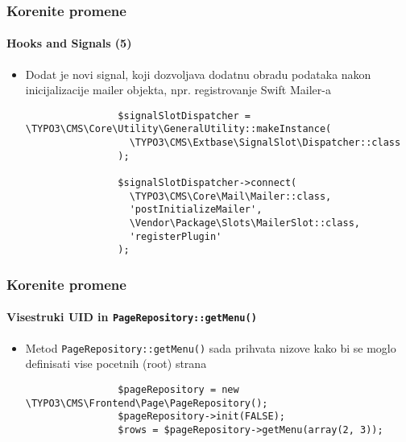 
\begin{frame}[fragile]
	\frametitle{Korenite promene}
	\framesubtitle{Hooks and Signals (5)}

	\lstset{basicstyle=\tiny\ttfamily}

	\begin{itemize}

		\item Dodat je novi signal, koji dozvoljava dodatnu obradu podataka nakon inicijalizacije
			mailer objekta, npr. registrovanje Swift Mailer-a

			\begin{lstlisting}
				$signalSlotDispatcher = \TYPO3\CMS\Core\Utility\GeneralUtility::makeInstance(
				  \TYPO3\CMS\Extbase\SignalSlot\Dispatcher::class
				);

				$signalSlotDispatcher->connect(
				  \TYPO3\CMS\Core\Mail\Mailer::class,
				  'postInitializeMailer',
				  \Vendor\Package\Slots\MailerSlot::class,
				  'registerPlugin'
				);
		\end{lstlisting}

	\end{itemize}

\end{frame}


\begin{frame}[fragile]
	\frametitle{Korenite promene}
	\framesubtitle{Visestruki UID in \texttt{PageRepository::getMenu()}}

	\begin{itemize}


		\item Metod \texttt{PageRepository::getMenu()} sada prihvata nizove kako bi se moglo definisati vise pocetnih (root) strana

			\begin{lstlisting}
				$pageRepository = new \TYPO3\CMS\Frontend\Page\PageRepository();
				$pageRepository->init(FALSE);
				$rows = $pageRepository->getMenu(array(2, 3));
			\end{lstlisting}

	\end{itemize}

\end{frame}

